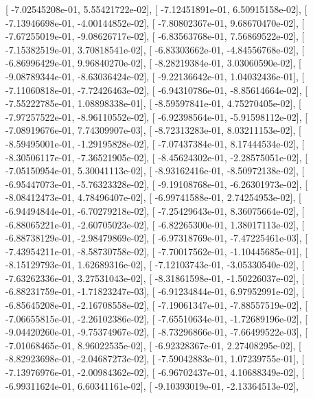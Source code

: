 \documentclass{article}
\begin{document}
       [ -7.02545208e-01,   5.55421722e-02],
       [ -7.12451891e-01,   6.50915158e-02],
       [ -7.13946698e-01,  -4.00144852e-02],
       [ -7.80802367e-01,   9.68670470e-02],
       [ -7.67255019e-01,  -9.08626717e-02],
       [ -6.83563768e-01,   7.56869522e-02],
       [ -7.15382519e-01,   3.70818541e-02],
       [ -6.83303662e-01,  -4.84556768e-02],
       [ -6.86996429e-01,   9.96840270e-02],
       [ -8.28219384e-01,   3.03060590e-02],
       [ -9.08789344e-01,  -8.63036424e-02],
       [ -9.22136642e-01,   1.04032436e-01],
       [ -7.11060818e-01,  -7.72426463e-02],
       [ -6.94310786e-01,  -8.85614664e-02],
       [ -7.55222785e-01,   1.08898338e-01],
       [ -8.59597841e-01,   4.75270405e-02],
       [ -7.97257522e-01,  -8.96110552e-02],
       [ -6.92398564e-01,  -5.91598112e-02],
       [ -7.08919676e-01,   7.74309907e-03],
       [ -8.72313283e-01,   8.03211153e-02],
       [ -8.59495001e-01,  -1.29195828e-02],
       [ -7.07437384e-01,   8.17444534e-02],
       [ -8.30506117e-01,  -7.36521905e-02],
       [ -8.45624302e-01,  -2.28575051e-02],
       [ -7.05150954e-01,   5.30041113e-02],
       [ -8.93162416e-01,  -8.50972138e-02],
       [ -6.95447073e-01,  -5.76323328e-02],
       [ -9.19108768e-01,  -6.26301973e-02],
       [ -8.08412473e-01,   4.78496407e-02],
       [ -6.99741588e-01,   2.74254953e-02],
       [ -6.94494844e-01,  -6.70279218e-02],
       [ -7.25429643e-01,   8.36075664e-02],
       [ -6.88065221e-01,  -2.60705023e-02],
       [ -6.82265300e-01,   1.38017113e-02],
       [ -6.88738129e-01,  -2.98479869e-02],
       [ -6.97318769e-01,  -7.47225461e-03],
       [ -7.43954211e-01,  -8.58730758e-02],
       [ -7.70017562e-01,  -1.10445685e-01],
       [ -8.15129793e-01,   1.62689316e-02],
       [ -7.12103743e-01,  -3.05330540e-02],
       [ -7.63262336e-01,   3.27531043e-02],
       [ -8.31861598e-01,  -1.50226037e-02],
       [ -6.88231759e-01,  -1.71823247e-03],
       [ -6.91234844e-01,   6.97952991e-02],
       [ -6.85645208e-01,  -2.16708558e-02],
       [ -7.19061347e-01,  -7.88557519e-02],
       [ -7.06655815e-01,  -2.26102386e-02],
       [ -7.65510634e-01,  -1.72689196e-02],
       [ -9.04420260e-01,  -9.75374967e-02],
       [ -8.73296866e-01,  -7.66499522e-03],
       [ -7.01068465e-01,   8.96022535e-02],
       [ -6.92328367e-01,   2.27408295e-02],
       [ -8.82923698e-01,  -2.04687273e-02],
       [ -7.59042883e-01,   1.07239755e-01],
       [ -7.13976976e-01,  -2.00984362e-02],
       [ -6.96702437e-01,   4.10688349e-02],
       [ -6.99311624e-01,   6.60341161e-02],
       [ -9.10393019e-01,  -2.13364513e-02],
\end{document}
